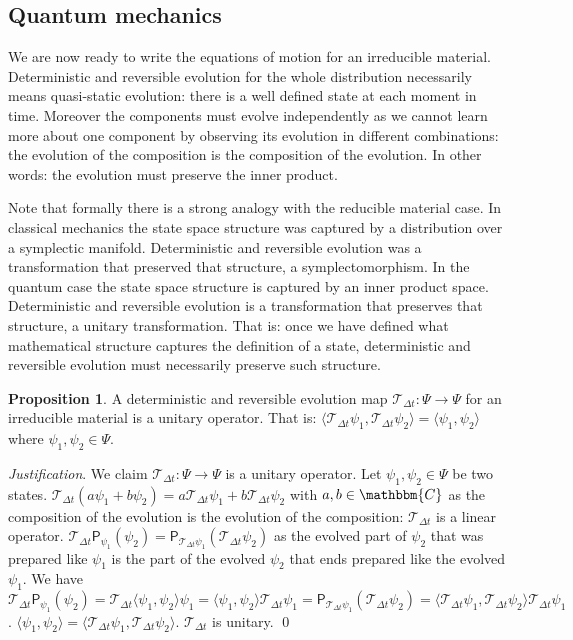 \documentclass[aps,pra,10pt,twocolumn,floatfix,nofootinbib]{revtex4-1}
\numberwithin{equation}{section}
\theoremstyle{definition}
\newtheorem{prop}[equation]{Proposition}
\newenvironment{justification}{\emph{Justification}.}{\qed}
\begin{document}
\subsection{Quantum mechanics}

We are now ready to write the equations of motion for an irreducible material. Deterministic and reversible evolution for the whole distribution necessarily means quasi-static evolution: there is a well defined state at each moment in time. Moreover the components must evolve independently as we cannot learn more about one component by observing its evolution in different combinations: the evolution of the composition is the composition of the evolution. In other words: the evolution must preserve the inner product.

Note that formally there is a strong analogy with the reducible material case. In classical mechanics the state space structure was captured by a distribution over a symplectic manifold. Deterministic and reversible evolution was a transformation that preserved that structure, a symplectomorphism. In the quantum case the state space structure is captured by an inner product space. Deterministic and reversible evolution is a transformation that preserves that structure, a unitary transformation. That is: once we have defined what mathematical structure captures the definition of a state, deterministic and reversible evolution must necessarily preserve such structure.

\begin{prop}\label{prop:unitary_evolution}
	A deterministic and reversible evolution map $\mathcal{T}_{\Delta t}: \Psi \rightarrow \Psi$ for an irreducible material is a unitary operator. That is: $\langle \mathcal{T}_{\Delta t} \psi_1, \mathcal{T}_{\Delta t} \psi_2 \rangle = \langle \psi_1 , \psi_2 \rangle$ where $\psi_1, \psi_2 \in \Psi$.
\end{prop}

\begin{justification}
	We claim $\mathcal{T}_{\Delta t}: \Psi \rightarrow \Psi$ is a unitary operator. Let $\psi_1, \psi_2 \in \Psi$ be two states. $\mathcal{T}_{\Delta t}(a\psi_1+b\psi_2) = a \mathcal{T}_{\Delta t} \psi_1 + b \mathcal{T}_{\Delta t} \psi_2$ with $a,b \in \mathbbm{C}$ as the composition of the evolution is the evolution of the composition: $\mathcal{T}_{\Delta t}$ is a linear operator. $\mathcal{T}_{\Delta t} \mathsf{P}_{\psi_1} (\psi_2) = \mathsf{P}_{\mathcal{T}_{\Delta t}\psi_1} (\mathcal{T}_{\Delta t}\psi_2)$ as the evolved part of $\psi_2$ that was prepared like $\psi_1$ is the part of the evolved $\psi_2$ that ends prepared like the evolved $\psi_1$. We have $\mathcal{T}_{\Delta t} \mathsf{P}_{\psi_1} (\psi_2) = \mathcal{T}_{\Delta t} \langle \psi_1 , \psi_2 \rangle \psi_1 = \langle \psi_1 , \psi_2 \rangle \mathcal{T}_{\Delta t} \psi_1 = \mathsf{P}_{\mathcal{T}_{\Delta t}\psi_1} (\mathcal{T}_{\Delta t}\psi_2) = \langle \mathcal{T}_{\Delta t}\psi_1 , \mathcal{T}_{\Delta t}\psi_2 \rangle \mathcal{T}_{\Delta t} \psi_1$. $\langle \psi_1 , \psi_2 \rangle = \langle \mathcal{T}_{\Delta t}\psi_1 , \mathcal{T}_{\Delta t}\psi_2 \rangle$. $\mathcal{T}_{\Delta t}$ is unitary.
\end{justification}
	
\end{document}
